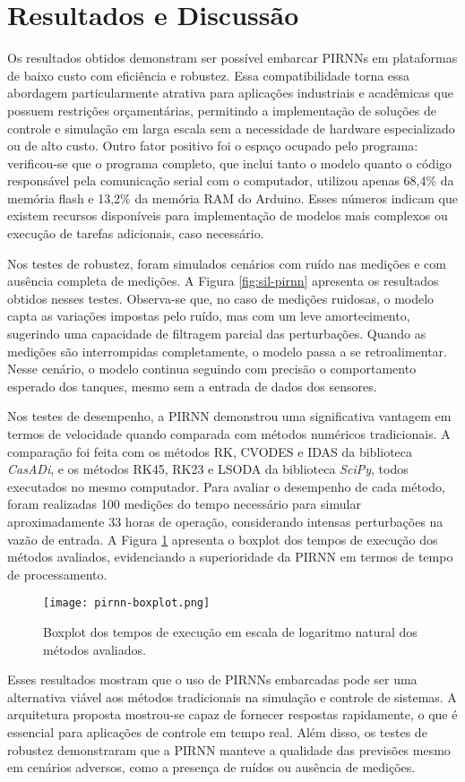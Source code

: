 \section{Resultados e Discussão}

Os resultados obtidos demonstram ser possível embarcar PIRNNs em plataformas de baixo custo com eficiência e robustez. Essa compatibilidade torna essa abordagem particularmente atrativa para aplicações industriais e acadêmicas que possuem restrições orçamentárias, permitindo a implementação de soluções de controle e simulação em larga escala sem a necessidade de hardware especializado ou de alto custo. Outro fator positivo foi o espaço ocupado pelo programa: verificou-se que o programa completo, que inclui tanto o modelo quanto o código responsável pela comunicação serial com o computador, utilizou apenas 68,4\% da memória flash e 13,2\% da memória RAM do Arduino. Esses números indicam que existem recursos disponíveis para implementação de modelos mais complexos ou execução de tarefas adicionais, caso necessário.

Nos testes de robustez, foram simulados cenários com ruído nas medições e com ausência completa de medições. A Figura \ref{fig:sil-pirnn} apresenta os resultados obtidos nesses testes. Observa-se que, no caso de medições ruidosas, o modelo capta as variações impostas pelo ruído, mas com um leve amortecimento, sugerindo uma capacidade de filtragem parcial das perturbações. Quando as medições são interrompidas completamente, o modelo passa a se retroalimentar. Nesse cenário, o modelo continua seguindo com precisão o comportamento esperado dos tanques, mesmo sem a entrada de dados dos sensores.


Nos testes de desempenho, a PIRNN demonstrou uma significativa vantagem em termos de velocidade quando comparada com métodos numéricos tradicionais. A comparação foi feita com os métodos RK, CVODES e IDAS da biblioteca \textit{CasADi}, e os métodos RK45, RK23 e LSODA da biblioteca \textit{SciPy}, todos executados no mesmo computador. Para avaliar o desempenho de cada método, foram realizadas 100 medições do tempo necessário para simular aproximadamente 33 horas de operação, considerando intensas perturbações na vazão de entrada. A Figura \ref{fig:pirnn-benchmark-lite} apresenta o boxplot dos tempos de execução dos métodos avaliados, evidenciando a superioridade da PIRNN em termos de tempo de processamento.

\begin{figure}[ht]
  \centering
  \texttt{[image: pirnn-boxplot.png]}
  \caption{Boxplot dos tempos de execução em escala de logaritmo natural dos métodos avaliados.}
  \label{fig:pirnn-benchmark-lite}
\end{figure}

Esses resultados mostram que o uso de PIRNNs embarcadas pode ser uma alternativa viável aos métodos tradicionais na simulação e controle de sistemas. A arquitetura proposta mostrou-se capaz de fornecer respostas rapidamente, o que é essencial para aplicações de controle em tempo real. Além disso, os testes de robustez demonstraram que a PIRNN manteve a qualidade das previsões mesmo em cenários adversos, como a presença de ruídos ou ausência de medições.
